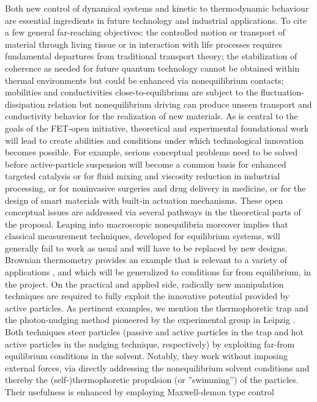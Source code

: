 Both new control of dynamical systems and kinetic to thermodynamic behaviour are essential
ingredients in future technology and industrial applications.  To cite a few general
far-reaching objectives: the controlled motion or transport of material through living
tissue or in interaction with life processes requires fundamental departures from
traditional transport theory; the stabilization of coherence as needed for future quantum
technology cannot be obtained within thermal environments but could be enhanced via
nonequilibrium contacts; mobilities and conductivities close-to-equilibrium are subject to
the fluctuation-dissipation relation but nonequilibrium driving can produce unseen transport
and conductivity behavior for the realization of new materials.  As is central to the goals
of the FET-open initiative, theoretical and experimental foundational work will lead to
create abilities and conditions under which technological innovation becomes possible.  For
example, serious conceptual problems need to be solved before active-particle suspension
will become a common basis for enhanced targeted catalysis or for fluid mixing and viscosity
reduction in industrial processing, or for noninvasive surgeries and drug delivery in
medicine, or for the design of smart materials with built-in actuation mechanisms. These
open conceptual issues are addressed via several pathways in the theoretical parts of the
proposal.  Leaping into macroscopic nonequilibria moreover implies that classical
measurement techniques, developed for equilibrium systems, will generally fail to work as
usual and will have to be replaced by new designs. Brownian thermometry provides an example
that is relevant to a variety of applications \cite{kroy:2014}, and which will be
generalized to conditions far from equilibrium, in the project.  On the practical and
applied side, radically new manipulation techniques are required to fully exploit the
innovative potential provided by active particles. As pertinent examples, we mention the
thermophoretic trap and the photon-nudging method pioneered by the experimental group in
Leipzig \cite{Qian2013,Braun:NanoLetters:2015}.  Both techniques steer particles (passive
and active particles in the trap and hot active particles in the nudging technique,
respectively) by exploiting far-from equilibrium conditions in the solvent. Notably, they
work without imposing external forces, via directly addressing the nonequilibrium solvent
conditions and thereby the (self-)thermophoretic propulsion (or ''swimming'') of the
particles. Their usefulness is enhanced by employing Maxwell-demon type control
